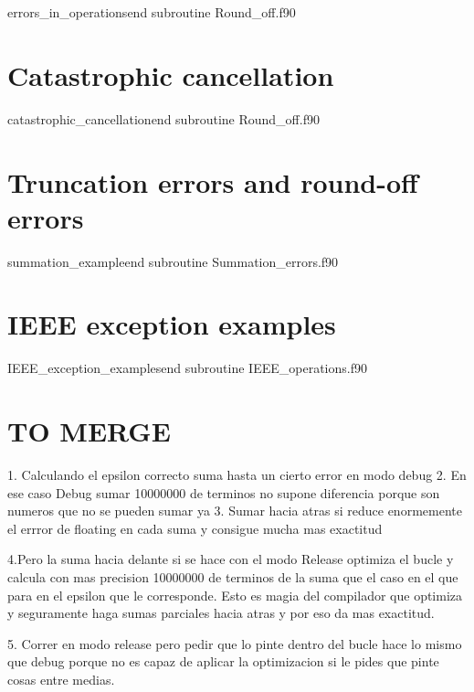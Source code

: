     
    
{errors_in_operations}{end subroutine}
{Round_off.f90} 



\newpage    
\section{Catastrophic cancellation}  \label{sec:cancellation}
    
    
{catastrophic_cancellation}{end subroutine}
{Round_off.f90} 





\newpage    
\section{Truncation errors and round-off errors}
    
     
{summation_example}{end subroutine}
{Summation_errors.f90} 



\newpage    
\section{IEEE exception examples}
    
    
{IEEE_exception_examples}{end subroutine}
{IEEE_operations.f90} 






\section{TO MERGE}


1. Calculando el epsilon correcto suma hasta un cierto error en modo debug
2. En ese caso Debug sumar 10000000 de terminos no supone diferencia porque son numeros que no se pueden sumar ya
3. Sumar hacia atras si reduce enormemente el errror de floating en cada suma y consigue mucha mas exactitud

4.Pero la suma hacia delante si se hace con el modo Release optimiza el bucle y calcula con  mas precision 10000000 de terminos de la suma que el caso en el que para en el epsilon que le corresponde. Esto es magia del compilador que optimiza y seguramente haga sumas parciales hacia atras y por eso da mas exactitud. 

5. Correr en modo release pero pedir que lo pinte dentro del bucle hace lo mismo que debug porque no es capaz de aplicar la optimizacion si le pides que pinte cosas entre medias. 

